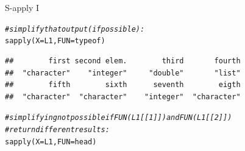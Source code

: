 \documentclass[xcolor=table,       handout,    xcolor=dvipsnames]{beamer}\usepackage[]{graphicx}\usepackage[]{color}
\makeatletter
\newcommand{\hlcom}[1]{\textcolor[rgb]{0,0.392,0}{\textit{#1}}}
\newcommand{\hlstd}[1]{\textcolor[rgb]{0,0,0}{#1}}
\newcommand{\hlkwc}[1]{\textcolor[rgb]{1,0,1}{#1}}
\newcommand{\hlkwd}[1]{\textcolor[rgb]{0,0,1}{#1}}
\newenvironment{kframe}{%
 \def\at@end@of@kframe{}%
 \ifinner\ifhmode%
  \def\at@end@of@kframe{\end{minipage}}%
  \begin{minipage}{\columnwidth}%
 \fi\fi%
 \def\FrameCommand##1{\hskip\@totalleftmargin \hskip-\fboxsep
 \colorbox{shadecolor}{##1}\hskip-\fboxsep
     \hskip-\linewidth \hskip-\@totalleftmargin \hskip\columnwidth}%
 \MakeFramed {\advance\hsize-\width
   \@totalleftmargin\z@ \linewidth\hsize
   \@setminipage}}%
 {\par\unskip\endMakeFramed%
 \at@end@of@kframe}
\newenvironment{knitrout}{}{} %
\makeatother
\begin{document}

\begin{frame}[fragile]{S-apply I}
\begin{knitrout}
\color{fgcolor}\begin{kframe}
\begin{alltt}
\hlcom{# simplify that output (if possible):}
    \hlkwd{sapply}\hlstd{(}\hlkwc{X}\hlstd{=L1,} \hlkwc{FUN}\hlstd{=typeof)}
\end{alltt}
\begin{verbatim}
##        first second elem.        third       fourth 
##  "character"    "integer"     "double"       "list" 
##        fifth        sixth      seventh        eigth 
##  "character"  "character"    "integer"  "character"
\end{verbatim}
\end{kframe}
\end{knitrout}
\pause
\begin{knitrout}
\color{fgcolor}\begin{kframe}
\begin{alltt}
\hlcom{# simplifying not possible if FUN(L1[[1]]) and FUN(L1[[2]])}
\hlcom{# return different results:}
\hlkwd{sapply}\hlstd{(}\hlkwc{X}\hlstd{=L1,} \hlkwc{FUN}\hlstd{=head)}
\end{alltt}
\end{kframe}
\end{knitrout}
\end{frame}

\end{document}
